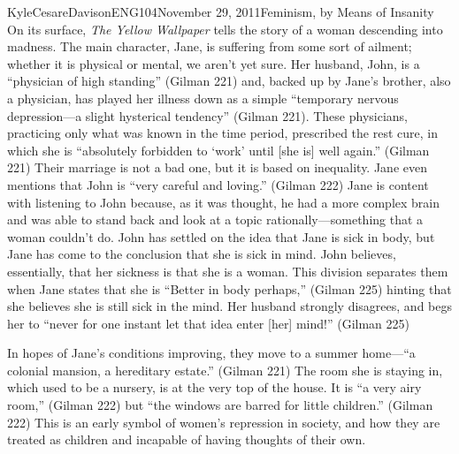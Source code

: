 \documentclass[11pt,letterpaper]{article}
\begin{document}
\begin{mla}{Kyle}{Cesare}{Davison}{ENG104}{November 29, 2011}{Feminism, by Means
of Insanity}
On its surface, \emph{The Yellow Wallpaper} tells the story of a woman
descending into madness.  The main character, Jane, is suffering from some sort
of ailment; whether it is physical or mental, we aren't yet sure.  Her husband,
John, is a ``physician of high standing'' (Gilman 221) and, backed up by Jane's
brother, also a physician, has played her illness down as a simple ``temporary
nervous depression---a slight hysterical tendency'' (Gilman 221).  These
physicians, practicing only what was known in the time period, prescribed the
rest cure, in which she is ``absolutely forbidden to `work' until [she is] well
again.'' (Gilman 221)  Their marriage is not a bad one, but it is based on
inequality.  Jane even mentions that John is ``very careful and loving.''
(Gilman 222)  Jane is content with listening to John because, as it was thought,
he had a more complex brain and was able to stand back and look at a topic
rationally---something that a woman couldn't do.  John has settled on the idea
that Jane is sick in body, but Jane has come to the conclusion that she is sick
in mind.  John believes, essentially, that her sickness is that she is a woman.
This division separates them when Jane states that she is ``Better in body
perhaps,'' (Gilman 225) hinting that she believes she is still sick in the mind.
Her husband strongly disagrees, and begs her to ``never for one instant let that
idea enter [her] mind!'' (Gilman 225)

In hopes of Jane's conditions improving, they move to a summer home---``a
colonial mansion, a hereditary estate.'' (Gilman 221)  The room she is staying
in, which used to be a nursery, is at the very top of the house.  It is ``a very
airy room,'' (Gilman 222) but ``the windows are barred for little children.''
(Gilman 222)  This is an early symbol of women's repression in society, and how
they are treated as children and incapable of having thoughts of their own.


\end{mla}
\end{document}
